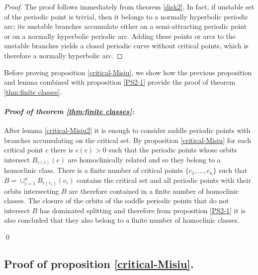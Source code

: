\documentclass[a4paper,11pt]{article}
\theoremstyle{definition}
\def\e{\epsilon}
\begin{document}
\begin{proof}


    

The proof follows immediately from theorem \ref{disk2}. In fact,  if unstable set of the periodic point is trivial, then it  belongs to a normally hyperbolic periodic arc; its unstable branches accumulate either on a semi-attracting periodic point or on a normally hyperbolic periodic arc. Adding these points or arcs to the unstable branches yields a closed periodic curve without critical points, which is therefore a normally hyperbolic arc.


\end{proof}




Before proving proposition \ref{critical-Misiu}, we show how the previous proposition and lemma combined with proposition \ref{PS2-1} provide the proof of theorem \ref{thm:finite classes}.


\paragraph{\it Proof of theorem \ref{thm:finite classes}:} After lemma \ref{critical-Misiu2} it is enough to consider saddle periodic points with branches accumulating on the critical set. By proposition \ref{critical-Misiu} for each critical point $c$ there is $\e(c)>0$ such that  the periodic points  whose orbits intersect $B_{\e(c)}(c)$ are homoclinically related and so they belong to a homoclinic class. There is a finite number of critical points $\{c_1,\dots, c_n\}$ such that  $B=\cup_{i=1}^n B_{\e(c_i)}(c_i)$ contains the critical set and all periodic points with their orbits intersecting $B$ are therefore  contained in a finite number of homoclinic classes. The closure of the orbits of the saddle  periodic points that do not intersect $B$ has dominated splitting and therefore   from proposition \ref{PS2-1} it is also concluded that they also belong to a finite number of homoclinic classes. 

\qed

\subsection{Proof of proposition \ref{critical-Misiu}.}
\end{document}
